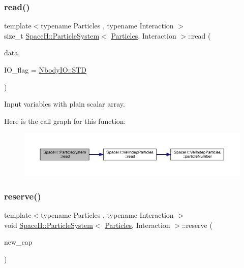 \subsubsection{\texorpdfstring{read()}{read()}}
{\footnotesize\ttfamily template$<$typename Particles , typename Interaction $>$ \\
size\+\_\+t \mbox{\hyperlink{class_space_h_1_1_particle_system}{Space\+H\+::\+Particle\+System}}$<$ \mbox{\hyperlink{struct_space_h_1_1_particles}{Particles}}, Interaction $>$\+::read (\begin{DoxyParamCaption}\item[{const \mbox{\hyperlink{class_space_h_1_1_particle_system_a71f8e04a3c8adc44b2a8b41e0cd55278}{Scalar\+Buffer}} \&}]{data,  }\item[{const \mbox{\hyperlink{namespace_space_h_a296a8bae763a754564bfdce216e31b59}{Nbody\+IO}}}]{I\+O\+\_\+flag = {\ttfamily \mbox{\hyperlink{namespace_space_h_a296a8bae763a754564bfdce216e31b59ac6ce23be5d350ce18a665427d2d950f7}{Nbody\+I\+O\+::\+S\+TD}}} }\end{DoxyParamCaption})\hspace{0.3cm}{\ttfamily [inline]}}



Input variables with plain scalar array. 

Here is the call graph for this function\+:
\nopagebreak
\begin{figure}[H]
\begin{center}
\leavevmode
\includegraphics[width=350pt]{class_space_h_1_1_particle_system_af8c8bbae833f6031b1b55a66aafa0475_cgraph}
\end{center}
\end{figure}
\mbox{\label{class_space_h_1_1_particle_system_a8c62e209b283261d3e616ff23eddd748}} 
\subsubsection{\texorpdfstring{reserve()}{reserve()}}
{\footnotesize\ttfamily template$<$typename Particles , typename Interaction $>$ \\
void \mbox{\hyperlink{class_space_h_1_1_particle_system}{Space\+H\+::\+Particle\+System}}$<$ \mbox{\hyperlink{struct_space_h_1_1_particles}{Particles}}, Interaction $>$\+::reserve (\begin{DoxyParamCaption}\item[{size\+\_\+t}]{new\+\_\+cap }\end{DoxyParamCaption})\hspace{0.3cm}{\ttfamily [inline]}}



